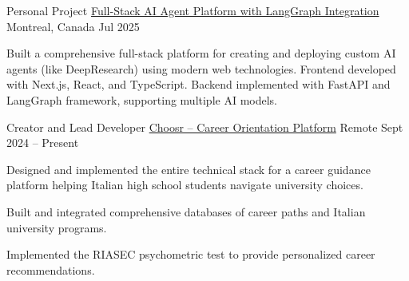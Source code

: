 
\newcommand\gitscale{0.015}
\newcommand\bpscale{0.028}

\begin{cventries}


\cventry
  {Personal Project} %
  {\href{https://github.com/Dundalia/agent-studio}{Full-Stack AI Agent Platform with LangGraph Integration}} 
  {Montreal, Canada} %
  {Jul 2025} %
  {
    \begin{cvitems} %
      \item {Built a comprehensive full-stack platform for creating and deploying custom AI agents (like DeepResearch) using modern web technologies. Frontend developed with Next.js, React, and TypeScript. Backend implemented with FastAPI and LangGraph framework, supporting multiple AI models.}
    \end{cvitems}
  }
\cventry
  {Creator and Lead Developer} %
  {\href{https://choosr.it/esplora-carriere}{Choosr -- Career Orientation Platform}} 
  {Remote} %
  {Sept 2024 -- Present} %
  {
    \begin{cvitems} %
      \item {Designed and implemented the entire technical stack for a career guidance platform helping Italian high school students navigate university choices. }
      \item {Built and integrated comprehensive databases of career paths and Italian university programs.}
      \item {Implemented the RIASEC psychometric test to provide personalized career recommendations.}
    \end{cvitems}
  }



\end{cventries}
